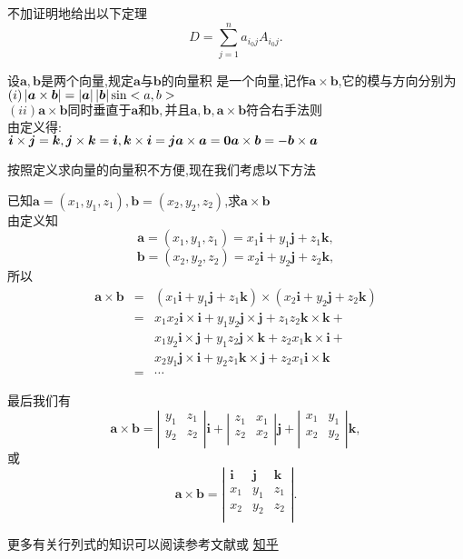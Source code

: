  不加证明地给出以下定理
$$
D=\sum_{j=1}^{n}a_{i_0j}A_{i_0j}.
$$

 设$\bm{a},\bm{b}$是两个向量,规定$\bm{a}$与$\bm{b}$的向量积
是一个向量,记作$\bm{a}\times\bm{b}$,它的模与方向分别为\\
$(i) \left| {\bm{a}\times\bm{b}} \right|=\left| {\bm{a}} \right|\left| {\bm{b}} \right|\sin<a,b>$\\
$(ii)\bm{a}\times\bm{b}\textbf{同时垂直于}\bm{a}\textbf{和}\bm{b},\textbf{并且}\bm{a},\bm{b},\bm{a}\times\bm{b}\textbf{符合右手法则}$\\
由定义得:\\
$\bm{i}\times\bm{j}=\bm{k},\bm{j}\times\bm{k}=\bm{i},\bm{k}\times\bm{i}=\bm{j}\\ 
\bm{a}\times\bm{a}=\bm{0}\\
\bm{a}\times\bm{b}=-\bm{b}\times\bm{a}
$


按照定义求向量的向量积不方便,现在我们考虑以下方法

\prob 已知$\bm{a}=(x_1,y_1,z_1),\bm{b}=(x_2,y_2,z_2)$,求$\bm{a}\times\bm{b}$\\
\sol
由定义知
$$\bm{a}=(x_1,y_1,z_1)
=x_1\bm{i}+y_1\bm{j}+z_1\bm{k},$$
$$\bm{b}=(x_2,y_2,z_2)=
x_2\bm{i}+y_2\bm{j}+z_2\bm{k},
$$
所以 
\begin{eqnarray}
  \bm{a}\times\bm{b}
  &=&(x_1\bm{i}+y_1\bm{j}+z_1\bm{k})\times(x_2\bm{i}+y_2\bm{j}+z_2\bm{k})\nonumber\\
  &=&x_1x_2\bm{i}\times\bm{i}+y_1y_2\bm{j}\times\bm{j}+z_1z_2\bm{k}\times\bm{k}+\nonumber\\
  &&x_1y_2\bm{i}\times\bm{j}+y_1z_2\bm{j}\times\bm{k}+z_2x_1\bm{k}\times\bm{i}+\nonumber\\
  &&x_2y_1\bm{j}\times\bm{i}+y_2z_1\bm{k}\times\bm{j}+z_2x_1\bm{i}\times\bm{k}\nonumber\\
  &=&\cdots\nonumber
\end{eqnarray}

最后我们有
$$
\bm{a}\times\bm{b}=
\left|
  \begin{array}{cc}
    y_1&z_1\\
    y_2&z_2\\
  \end{array}
\right|\bm{i}
+
\left|
  \begin{array}{cc}
    z_1&x_1\\
    z_2&x_2\\
  \end{array}
\right|\bm{j}
+
\left|
  \begin{array}{cc}
    x_1&y_1\\
    x_2&y_2\\
  \end{array}
\right|\bm{k},
$$
或
$$
\bm{a}\times\bm{b}=
\left|
  \begin{array}{ccc}
    \bm{i}&\bm{j}&\bm{k}\\
    x_1&y_1&z_1\\
    x_2&y_2&z_2\\
  \end{array}
\right|.
$$

更多有关行列式的知识可以阅读参考文献或
\href{https://www.zhihu.com/question/36966326}{知乎}